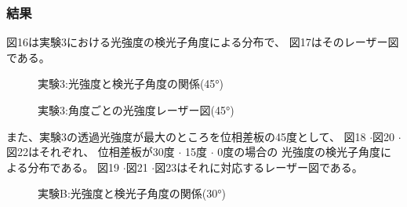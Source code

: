 \documentclass{article}
\begin{document}
\subsubsection{結果}
\begin{spacing}{1.2}
    図16は実験3における光強度の検光子角度による分布で、
    図17はそのレーザー図である。
    \begin{figure}[htbp]
        \centering
        \begin{minipage}[b]{0.5\textwidth} %
          \centering
          \caption{実験3:光強度と検光子角度の関係(45°)}
          \label{fig:16}
        \end{minipage}%
        \begin{minipage}[b]{0.5\textwidth}
          \centering
          \caption{実験3:角度ごとの光強度レーザー図(45°)}
          \label{fig:17}
        \end{minipage}
    \end{figure}
    \FloatBarrier
    また、実験3の透過光強度が最大のところを位相差板の45度として、
    図18 $\cdot$図20 $\cdot$図22はそれぞれ、
    位相差板が30度 $\cdot$ 15度 $\cdot$ 0度の場合の
    光強度の検光子角度による分布である。
    図19 $\cdot$図21 $\cdot$図23はそれに対応するレーザー図である。
    \begin{figure}[htbp]
        \centering
        \begin{minipage}[b]{0.5\textwidth} %
          \centering
          \caption{実験B:光強度と検光子角度の関係(30°)}
          \label{fig:18}
        \end{minipage}%

\end{figure}
\end{spacing}
\end{document}
